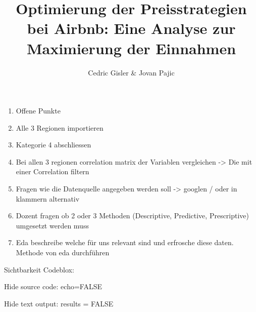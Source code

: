 \documentclass[
  journal,
]{IEEEtran}%
\title{Optimierung der Preisstrategien bei Airbnb: Eine Analyse zur
Maximierung der Einnahmen}
\author{
Cedric Gisler \& Jovan Pajic%

}
\providecommand{\tightlist}{%
  \setlength{\itemsep}{0pt}\setlength{\parskip}{0pt}}\usepackage{longtable,booktabs,array}
\begin{document}


\maketitle


%

\ifdefined\Shaded\renewenvironment{Shaded}{\begin{tcolorbox}[boxrule=0pt, sharp corners, enhanced, frame hidden, breakable, interior hidden, borderline west={3pt}{0pt}{shadecolor}]}{\end{tcolorbox}}\fi

\begin{enumerate}
\def\labelenumi{\arabic{enumi}.}
\setcounter{enumi}{-1}
\tightlist
\item
  Offene Punkte
\item
  Alle 3 Regionen importieren
\item
  Kategorie 4 abschliessen
\item
  Bei allen 3 regionen correlation matrix der Variablen vergleichen
  -\textgreater{} Die mit einer Correlation filtern
\item
  Fragen wie die Datenquelle angegeben werden soll -\textgreater{}
  googlen / oder in klammern alternativ
\item
  Dozent fragen ob 2 oder 3 Methoden (Descriptive, Predictive,
  Prescriptive) umgesetzt werden muss
\item
  Eda beschreibe welche für uns relevant sind und erfrosche diese daten.
  Methode von eda durchführen
\end{enumerate}

Sichtbarkeit Codeblox:

Hide source code: echo=FALSE

Hide text output: results = FALSE
\end{document}
